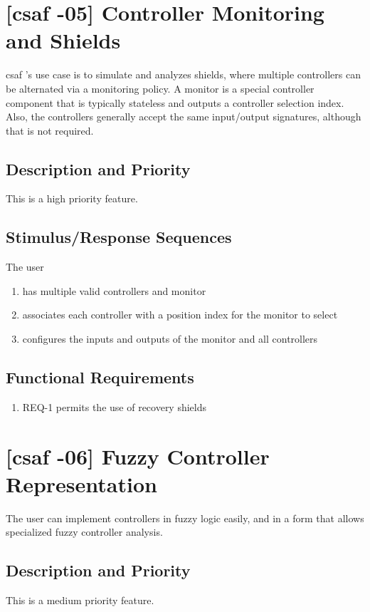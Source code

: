 \section{[\acrshort{csaf} -05] Controller Monitoring and Shields}

\acrshort{csaf} 's use case is to simulate and analyzes shields, where multiple controllers can be alternated 
via a monitoring policy. A monitor is a special controller component that is typically stateless and outputs a 
controller selection index. Also, the controllers generally accept the same input/output signatures, although 
that is not required. 

\subsection{Description and Priority}
This is a high priority feature.

\subsection{Stimulus/Response Sequences}
The user
\begin{enumerate}
\item has multiple valid controllers and monitor
\item associates each controller with a position index for the monitor to select 
\item  configures the inputs and outputs of the monitor and all controllers
\end{enumerate}

\subsection{Functional Requirements}
\begin{enumerate}
\item REQ-1 \quad permits the use of recovery shields
\end{enumerate}

\section{[\acrshort{csaf} -06] Fuzzy Controller Representation}

The user can implement controllers in fuzzy logic easily, and in a form that allows specialized fuzzy controller analysis. 

\subsection{Description and Priority}
This is a medium priority feature.

